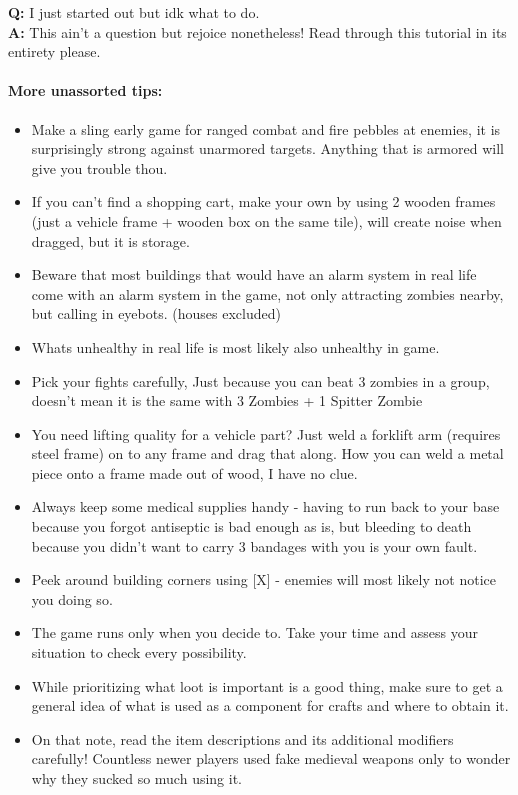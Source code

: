 \documentclass[11pt]{report}
\begin{document}
\textbf{Q:} I just started out but idk what to do.\\
\textbf{A:} This ain't a question but rejoice nonetheless! Read through this tutorial in its entirety please.

\paragraph{More unassorted tips:}
\begin{itemize}
\item Make a sling early game for ranged combat and fire pebbles at enemies, it is surprisingly strong against unarmored targets. Anything that is armored will give you trouble thou.
\item If you can't find a shopping cart, make your own by using 2 wooden frames (just a vehicle frame + wooden box on the same tile), will create noise when dragged, but it is storage.
\item Beware that most buildings that would have an alarm system in real life come with an alarm system in the game, not only attracting zombies nearby, but calling in eyebots. (houses excluded)
\item Whats unhealthy in real life is most likely also unhealthy in game.
\item Pick your fights carefully, Just because you can beat 3 zombies in a group, doesn't mean it is the same with 3 Zombies + 1 Spitter Zombie
\item You need lifting quality for a vehicle part? Just weld a forklift arm (requires steel frame) on to any frame and drag that along. How you can weld a metal piece onto a frame made out of wood, I have no clue.
\item Always keep some medical supplies handy - having to run back to your base because you forgot antiseptic is bad enough as is, but bleeding to death because you didn't want to carry 3 bandages with you is your own fault.
\item Peek around building corners using [X] - enemies will most likely not notice you doing so.
\item The game runs only when you decide to. Take your time and assess your situation to check every possibility.
\item While prioritizing what loot is important is a good thing, make sure to get a general idea of what is used as a component for crafts and where to obtain it.
\item On that note, read the item descriptions and its additional modifiers carefully! Countless newer players used fake medieval weapons only to wonder why they sucked so much using it.

\end{itemize}
\end{document}
